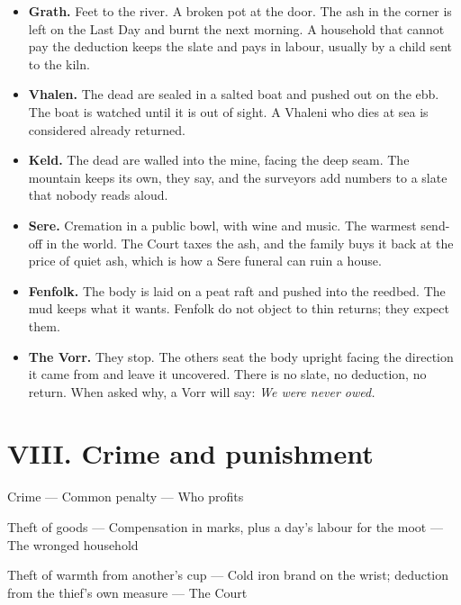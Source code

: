 \documentclass{design/chronicle}
\begin{document}
\begin{itemize}[leftmargin=1.4em,itemsep=1pt,topsep=3pt,parsep=0pt]

\item \textbf{Grath.} Feet to the river. A broken pot at the door. The ash in the corner is left on the Last Day and burnt the next morning. A household that cannot pay the deduction keeps the slate and pays in labour, usually by a child sent to the kiln.

\item \textbf{Vhalen.} The dead are sealed in a salted boat and pushed out on the ebb. The boat is watched until it is out of sight. A Vhaleni who dies at sea is considered already returned.

\item \textbf{Keld.} The dead are walled into the mine, facing the deep seam. The mountain keeps its own, they say, and the surveyors add numbers to a slate that nobody reads aloud.

\item \textbf{Sere.} Cremation in a public bowl, with wine and music. The warmest send-off in the world. The Court taxes the ash, and the family buys it back at the price of quiet ash, which is how a Sere funeral can ruin a house.

\item \textbf{Fenfolk.} The body is laid on a peat raft and pushed into the reedbed. The mud keeps what it wants. Fenfolk do not object to thin returns; they expect them.

\item \textbf{The Vorr.} They stop. The others seat the body upright facing the direction it came from and leave it uncovered. There is no slate, no deduction, no return. When asked why, a Vorr will say: \emph{We were never owed.}

\end{itemize}

\CRrule

\section*{VIII. Crime and punishment}

Crime — Common penalty — Who profits\par

Theft of goods — Compensation in marks, plus a day’s labour for the moot — The wronged household\par

Theft of warmth from another’s cup — Cold iron brand on the wrist; deduction from the thief’s own measure — The Court\par
\end{document}
